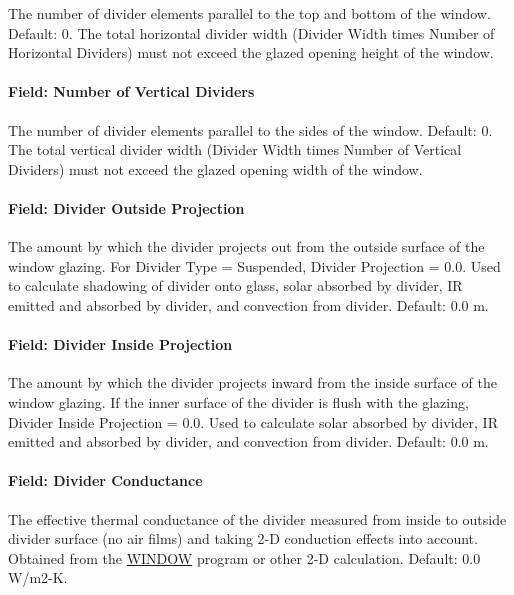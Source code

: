 The number of divider elements parallel to the top and bottom of the window. Default: 0. The total horizontal divider width (Divider Width times Number of Horizontal Dividers) must not exceed the glazed opening height of the window.

\paragraph{Field: Number of Vertical Dividers}\label{field-number-of-vertical-dividers}

The number of divider elements parallel to the sides of the window. Default: 0. The total vertical divider width (Divider Width times Number of Vertical Dividers) must not exceed the glazed opening width of the window.

\paragraph{Field: Divider Outside Projection}\label{field-divider-outside-projection}

The amount by which the divider projects out from the outside surface of the window glazing. For Divider Type = Suspended, Divider Projection = 0.0. Used to calculate shadowing of divider onto glass, solar absorbed by divider, IR emitted and absorbed by divider, and convection from divider. Default: 0.0 m.

\paragraph{Field: Divider Inside Projection}\label{field-divider-inside-projection}

The amount by which the divider projects inward from the inside surface of the window glazing. If the inner surface of the divider is flush with the glazing, Divider Inside Projection = 0.0. Used to calculate solar absorbed by divider, IR emitted and absorbed by divider, and convection from divider. Default: 0.0 m.

\paragraph{Field: Divider Conductance}\label{field-divider-conductance}

The effective thermal conductance of the divider measured from inside to outside divider surface (no air films) and taking 2-D conduction effects into account. Obtained from the \href{https://windows.lbl.gov/software-tools#window-heading}{WINDOW} program or other 2-D calculation. Default: 0.0 W/m2-K.

